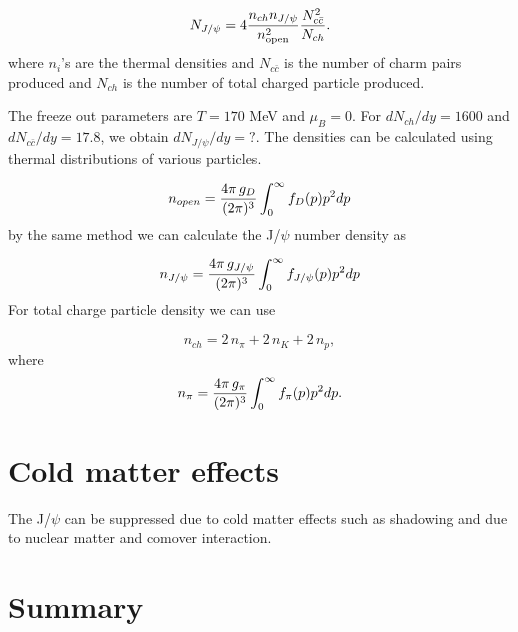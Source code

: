 \documentclass[aps,prc,preprint,superscriptaddress,showpacs,showkeys]{revtex4-1}
\begin{document}
  \begin{equation}
N_{J/\psi} = 4 {n_{ch} n_{J/\psi} \over n_{\rm open}^2}  {N_{c\bar c}^2 \over N_{ch} }.
\end{equation}
where $n_i$'s are the thermal densities and $N_{c\bar c}$ is the number of charm pairs produced 
and $N_{ch}$ is the number of total charged 
particle produced. 

The freeze out parameters are $T=170$ MeV and $\mu_B = 0$. For
$dN_{ch}/dy = 1600$ \cite{MULT} and $dN_{c \bar c} /dy = 17.8$, we obtain $dN_{J/\psi} /dy = ?$.
The densities can be calculated using thermal distributions of various particles.

\begin{equation}
n_{open} = {4\pi \,g_{D} \over (2\pi)^{3}} \int_{0}^{\infty} f_{D}(p)p^{2}dp
\end{equation}
by the same method we can calculate the J/$\psi$ number density as

\begin{equation}
n_{J/\psi} = {4\pi \,g_{J/\psi} \over (2\pi)^{3}} \int_{0}^{\infty} f_{J/\psi}(p)p^{2}dp 
\end{equation}
 For total charge particle density we can use 

\begin{equation}
n_{ch} = 2 \,n_{\pi} + 2\, n_{K} + 2\, n_{p},
\end{equation}
where
\begin{equation}
n_{\pi} = {4\pi \,g_{\pi} \over (2\pi)^{3}} \int_{0}^{\infty} f_{\pi}(p)p^{2}dp.
\end{equation}


\section{Cold matter effects}
  The J/$\psi$ can be suppressed due to cold matter effects such as shadowing and due to nuclear
matter and comover interaction.



\section{Summary}
\end{document}
